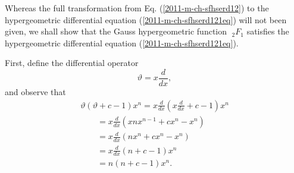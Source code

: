 {\color{OliveGreen}
\bproof

Whereas the full transformation from Eq. (\ref{2011-m-ch-sfhserd12})
to the hypergeometric differential equation  (\ref{2011-m-ch-sfhserd121eq}) will not been given, we shall show that
the Gauss hypergeometric function ${\;}_2F_1$ satisfies the hypergeometric differential equation (\ref{2011-m-ch-sfhserd121eq}).

First, define the differential operator
\begin{equation}
\vartheta = x \frac{d}{dx} ,
\label{2011-m-ch-sfhserddovt}
\end{equation}
and observe that
\begin{equation}
\begin{split}
\vartheta (\vartheta +c-1) x^n
=x \frac{d}{dx} \left( x \frac{d}{dx} +c-1\right) x^n\\  \qquad
=x \frac{d}{dx} \left( x n  x^{n-1}+c x^n- x^n\right)\\  \qquad
=x \frac{d}{dx} \left(   n  x^{n}+c x^n- x^n\right)\\     \qquad
=x \frac{d}{dx} \left(  n +c-1\right) x^n\\              \qquad
=n\left(  n +c-1\right) x^n.
\end{split}
\label{2011-m-ch-sfhserddovd1}
\end{equation}

}
